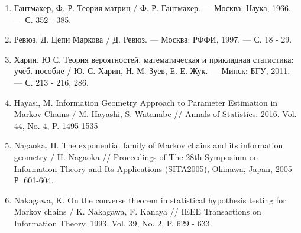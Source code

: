 \begin{enumerate}
	\item{Гантмахер, Ф. Р. Теория матриц / Ф. Р. Гантмахер. --- Москва: Наука, 1966. --- С. 352 - 385.}
	\item{Ревюз, Д. Цепи Маркова / Д. Ревюз. --- Москва: РФФИ, 1997. --- С. 18 - 29.}
	\item{Харин, Ю С. Теория вероятностей, математическая и прикладная статистика: учеб. пособие / Ю. С. Харин, Н. М. Зуев, Е. Е. Жук. --- Минск: БГУ, 2011. --- С. 213 - 216, 286.}
	\item{\label{Hayasi} Hayasi, M. Information Geometry Approach to Parameter Estimation in Markov Chains / M. Hayashi, S. Watanabe // Annals of Statistics. 2016. Vol. 44, No. 4, P. 1495-1535}
	\item{\label{Nagaoka} Nagaoka, H. The exponential family of Markov chains and its information geometry / H. Nagaoka // Proceedings of The 28th Symposium on Information Theory and Its Applications (SITA2005), Okinawa, Japan, 2005 Р. 601-604.}
	\item{\label{Nakagawa} Nakagawa, K. On the converse theorem in statistical hypothesis testing for Markov chains / K. Nakagawa, F. Kanaya //  IEEE Transactions on Information Theory. 1993. Vol. 39, No. 2, P. 629 - 633.}
\end{enumerate}